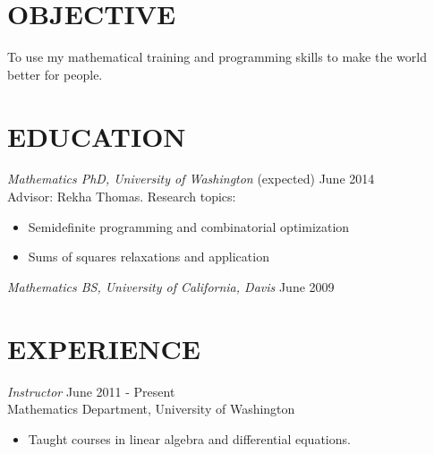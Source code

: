 \documentclass{res}
\begin{document}
 

\address{ {\selectfont http://www.jremop.com}\\{\selectfont jamesrpfeiffer@gmail.com}}
\address{142 21st Ave E \#3\\Seattle, WA 98112\\360-616-1403}


                                  
\begin{resume}

\section{OBJECTIVE}          
    To use my mathematical training and programming skills to make the world better for people.

\section{EDUCATION} {\sl Mathematics PhD, University of Washington} \hfill (expected) June 2014 \\
                Advisor: Rekha Thomas. Research topics:
                 \begin{itemize}  \itemsep -2pt %
                 \item Semidefinite programming and combinatorial optimization
                \item Sums of squares relaxations and application
                \end{itemize}
 
                {\sl Mathematics BS, University of California, Davis} \hfill            June 2009 


\section{EXPERIENCE} {\sl Instructor} \hfill June 2011 - Present\\
                Mathematics Department, University of Washington
                 \begin{itemize}  \itemsep -2pt %
                 \item Taught courses in linear algebra and differential equations.
                \end{itemize}
 

\end{resume}
\end{document}
